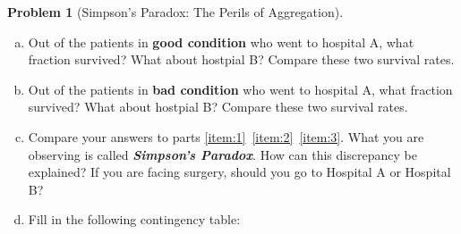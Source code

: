 \documentclass[10pt]{amsart}
\theoremstyle{definition}
\newtheorem{problem}[theorem]{Problem}
\newcommand{\1}[1]{\textbf{1}_{\left[#1\right]}} %
\newcommand{\dempfcolor}[1]{{\color{RoyalBlue}#1}}
\newcommand{\demph}[1]{\dempfcolor{\textbf{\textit{#1}}}}
\begin{document}
\begin{problem}[Simpson's Paradox: The Perils of Aggregation]
\begin{enumerate}[(a)]
    \begin{center}
      \begin{tabular}{cc}
        \begin{tabular}{lcc}
          \multicolumn{3}{c}{\textbf{Good Condition}} \\ \hline
          \textbf{Outcome} & \textbf{Hospital A} & \textbf{Hospital B} \\ \hline
          Died     &    6    & 8       \\
          Survived & 594       & 592       \\ \hline
        \end{tabular}
                       \quad \quad \quad \quad    &
                             \begin{tabular}{lcc}
                               \multicolumn{3}{c}{\textbf{Poor Condition}} \\ \hline
                               \textbf{Outcome} & \textbf{Hospital A} & \textbf{Hospital B} \\ \hline
                               Died     &  57      & 8       \\
                               Survived & 1443       & 192       \\ \hline
                             \end{tabular}
      \end{tabular}
    \end{center}
    What fraction of Hospital A's patients were classified as good
    condition? What about Hospital B?
    \item \label{item:2} Out of the patients in \textbf{good condition} who went to hospital A,
    what fraction survived? What about hostpial B? Compare these two survival
    rates.
    \item \label{item:3} Out of the patients in \textbf{bad condition} who went to hospital A,
    what fraction survived? What about hostpial B? Compare these two survival
    rates.
    \item Compare your answers to parts
    \ref{item:1}~\ref{item:2}~\ref{item:3}. What you are observing is called
    \demph{Simpson's Paradox}. How can this discrepancy be
    explained? If you are facing surgery, should you go to Hospital A or
    Hospital B?
    \item Fill in the following contingency table:
    \begin{center}
      \vspace{1em}
      \begin{tabular}{|l|c|c|}

\end{tabular}
\end{center}
\end{enumerate}
\end{problem}
\end{document}

